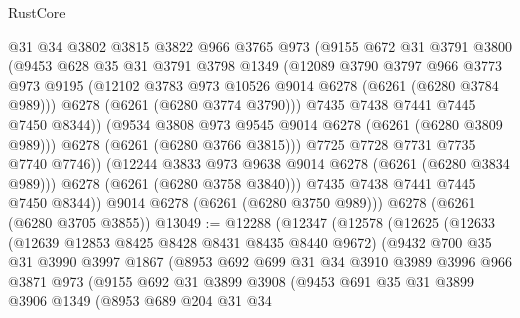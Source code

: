 \begin{lexlean}{RustCore}
\begin{coremodule}
                  @31
                  @34
                  @3802
                  @3815
                  @3822
                  @966
                  @3765
                  @973
                  (@9155
                    @672
                    @31
                    @3791
                    @3800
                    (@9453
                      @628
                      @35
                      @31
                      @3791
                      @3798
                      @1349
                      (@12089
                        @3790
                        @3797
                        @966
                        @3773
                        @973
                        @9195
                        (@12102 @3783 @973 @10526 @9014 @6278 (@6261 (@6280 @3784 @989)))
                        @6278
                        (@6261 (@6280 @3774 @3790)))
                      @7435
                      @7438
                      @7441
                      @7445
                      @7450
                      @8344))
                  (@9534 @3808 @973 @9545 @9014 @6278 (@6261 (@6280 @3809 @989)))
                  @6278
                  (@6261 (@6280 @3766 @3815)))
                @7725
                @7728
                @7731
                @7735
                @7740
                @7746))
            (@12244 @3833 @973 @9638 @9014 @6278 (@6261 (@6280 @3834 @989)))
            @6278
            (@6261 (@6280 @3758 @3840)))
          @7435
          @7438
          @7441
          @7445
          @7450
          @8344))
      @9014
      @6278
      (@6261 (@6280 @3750 @989)))
    @6278
    (@6261 (@6280 @3705 @3855))
@13049 := @12288
    (@12347
      (@12578
        (@12625
          (@12633
            (@12639 @12853 @8425 @8428 @8431 @8435 @8440 @9672)
            (@9432
              @700
              @35
              @31
              @3990
              @3997
              @1867
              (@8953
                @692
                @699
                @31
                @34
                @3910
                @3989
                @3996
                @966
                @3871
                @973
                (@9155
                  @692
                  @31
                  @3899
                  @3908
                  (@9453
                    @691
                    @35
                    @31
                    @3899
                    @3906
                    @1349
                    (@8953
                      @689
                      @204
                      @31
                      @34

\end{coremodule}
\end{lexlean}
